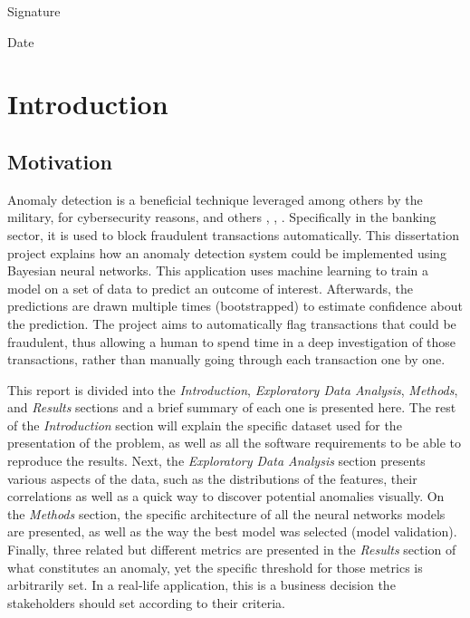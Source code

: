 \documentclass[11pt,twoside]{article}
\numberwithin{Theorem}{section}
\numberwithin{Definition}{section}
\numberwithin{Lemma}{section}
\numberwithin{Algorithm}{section}
\numberwithin{equation}{section}
\newcommand{\dottedline}[1]{\makebox[#1]{.\dotfill}}
\begin{document}
Signature \dottedline{8cm}

\vspace{5mm}

Date \dottedline{8cm}


\clearpage



\pagestyle{plain}
\setcounter{page}{1}

\tableofcontents
\clearpage
\listoftables
\listoffigures
\cleardoublepage

\setcounter{page}{1}

\nocite{*}
\clearpage

\section{Introduction}
\subsection{Motivation}
\label{sec:motivation}
Anomaly detection is a beneficial technique leveraged among others by the military,  for cybersecurity reasons, and others \cite{military}, \cite{cyber}, \cite{traffic}. Specifically in the banking sector, it is used to block fraudulent transactions automatically. This dissertation project explains how an anomaly detection system could be implemented using Bayesian neural networks. This application uses machine learning to train a model on a set of data to predict an outcome of interest. Afterwards, the predictions are drawn multiple times (bootstrapped) to estimate confidence about the prediction. The project aims to automatically flag transactions that could be fraudulent, thus allowing a human to spend time in a deep investigation of those transactions, rather than manually going through each transaction one by one.

This report is divided into the \textit{Introduction}, \textit{Exploratory Data Analysis}, \textit{Methods}, and \textit{Results} sections and a brief summary of each one is presented here. The rest of the \textit{Introduction} section will explain the specific dataset used for the presentation of the problem, as well as all the software requirements to be able to reproduce the results. Next, the \textit{Exploratory Data Analysis} section presents various aspects of the data, such as the distributions of the features, their correlations as well as a quick way to discover potential anomalies visually. On the \textit{Methods} section, the specific architecture of all the neural networks models are presented, as well as the way the best model was selected (model validation). Finally, three related but different metrics are presented in the \textit{Results} section of what constitutes an anomaly, yet the specific threshold for those metrics is arbitrarily set. In a real-life application, this is a business decision the stakeholders should set according to their criteria.
\end{document}
